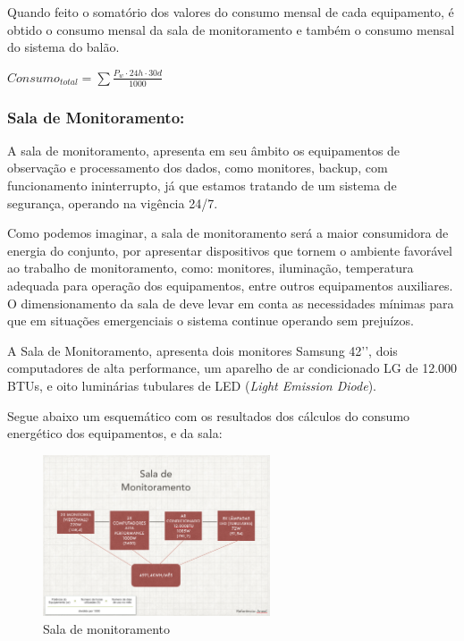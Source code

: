 Quando feito o somatório dos valores do consumo mensal de cada equipamento, é obtido o consumo mensal da sala de monitoramento e também o consumo mensal do sistema do balão.

$Consumo_{total} =  \sum{\frac{P_w \cdot 24h \cdot 30d}{1000}}$

 \subsubsection{Sala de Monitoramento:}

 A sala de monitoramento, apresenta em seu âmbito os equipamentos de observação e processamento dos dados, como monitores, backup, com funcionamento ininterrupto, já que estamos tratando de um sistema de segurança, operando na vigência 24/7.

Como podemos imaginar, a sala de monitoramento será a maior consumidora de energia do conjunto, por apresentar dispositivos que tornem o ambiente favorável ao trabalho de monitoramento, como: monitores, iluminação, temperatura adequada para operação dos equipamentos, entre outros equipamentos auxiliares. O dimensionamento da sala de deve levar em conta as necessidades mínimas para que em situações emergenciais o sistema continue operando sem prejuízos.

A Sala de Monitoramento, apresenta dois monitores Samsung 42’’, dois computadores de alta performance, um aparelho de ar condicionado LG de 12.000 BTUs, e oito luminárias tubulares de LED (\textit{Light Emission Diode}).

Segue abaixo um esquemático com os resultados dos cálculos do consumo energético dos equipamentos, e da sala:

\begin{figure}[H]
	\centering
	\includegraphics[width=0.6\textwidth]{figuras/salaMonitoramento}
	\caption{Sala de monitoramento}
	\label{img:salaMonitoramento}
\end{figure}



